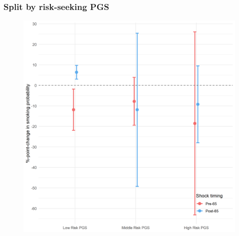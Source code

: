 \documentclass[10pt,compress,xcolor=dvipsnames,aspectratio=169]{beamer}    %
\newcounter{ex}
\newcommand{\1}[1]{\mathrm{1\hspace*{-2.5pt}l}[#1]}	%
\begin{document}
%
%
\begin{frame}
\frametitle{Split by risk-seeking PGS}

\begin{figure}[hbtp]
\centering
\includegraphics[height=0.8\textheight]{../../3_output/shock_effects/robustness_riskPGS_GWAS_6070_100_cvplot.png}
\label{fig:riskPGS}
\end{figure}
\hyperlink{frame:otherX}{}
\end{frame}

%
%
\end{document}
